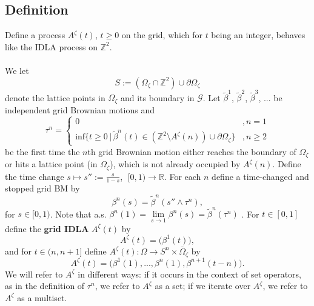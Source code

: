 \documentclass[11pt]{article}
\numberwithin{equation}{section}
\def\OZ{\Omega_{\zeta}}
\def\AZT{A^{\zeta}(t)}
\def\AZN{A^{\zeta}(n)}
\begin{document}
\subsection{Definition}
\label{sec: grid idla}
Define a process $\AZT$,  $t \geq 0$ on the grid, 
which for $t$ being an integer, behaves like the IDLA process on 
$\mathbb{Z}^2$.\\~\\
We let  
\begin{equation}\label{D: set S}
  S :=(\Omega_{\zeta} \cap \mathbb{Z}^2) \cup \partial \Omega_{\zeta}
\end{equation}
denote the lattice points in $\Omega_{\zeta}$ and its boundary in $\mathcal{G}$.
Let $\tilde{\beta}^1$, $\tilde{\beta}^2$, $\tilde{\beta}^3$, ...  
be independent grid Brownian motions and
$$\tau^n = 
  \begin{cases}
    0 &, n=1\\
    \text{inf}
       \{t \geq 0 \,|\,
         \tilde{\beta}^n(t) \in (\mathbb{Z}^2 \setminus \AZN) \cup \partial \OZ \}  &,
           n \geq 2
\end{cases}$$
be the first time the $n$th grid Brownian motion
either reaches the boundary of $\OZ$ or hits a lattice point (in $\OZ$), 
which is not already occupied by $\AZN$.
Define the 
time change $s \mapsto s'' := \frac{s}{1-s}$, $\;[0,1) \rightarrow \mathbb{R}$.
For each $n$ define a time-changed and stopped grid BM by
\begin{equation}\label{D: time changed grid BM}
  \beta^n(s) = \tilde{\beta}^n(s'' \land \tau^n),
\end{equation}
for $s \in [0,1)$. Note that a.s.
$\beta^n(1) = \lim\limits_{s \rightarrow 1}{\beta^n(s)}
   = \tilde{\beta}^n(\tau^n)$ .
For $t \in [0,1]$ define the \textbf{grid IDLA} $\AZT$ by
\begin{equation}
  \label{D: AZT}
  \nonumber
  \AZT = \big( \beta^1(t) \big),
\end{equation}
and for $t \in (n,n+1]$ define 
  $\AZT : \Omega \rightarrow S^{n} \times \bar{\Omega}_{\zeta}$ 
by
\begin{equation}\label{D: AZT, real def}
  \nonumber
 \AZT =  
  \big( 
    \beta^1(1),...,\beta^{n}(1),\beta^{n+1}(t-n)
  \big).
\end{equation}
We will refer to $A^{\zeta}$ in different ways: 
if it occurs in the context of set operators, 
as in the definition of $\tau^n$, we refer to $A^{\zeta}$ as a set;
if we iterate over $A^{\zeta}$, we refer to $A^{\zeta}$ as a multiset. 
\end{document}

